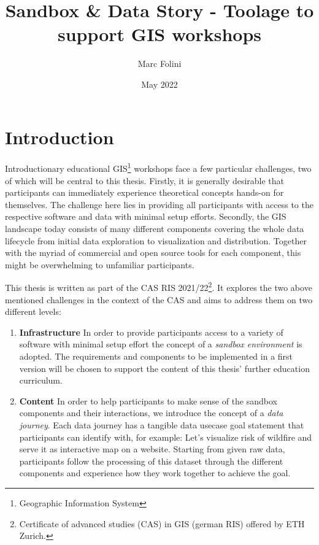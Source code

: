 \documentclass[12pt, letterpaper, twoside]{article}
\title{Sandbox \& Data Story - Toolage to support GIS workshops}
\author{Marc Folini}
\date{May 2022}
\begin{document}
\begin{titlepage}
  \setcounter{page}{1}
  \clearpage\maketitle
  \thispagestyle{empty}
  \vspace{2.5cm}
  \begin{abstract}
  \end{abstract}
\end{titlepage}

\newpage
\tableofcontents

\newpage
{}
\setcounter{page}{1}
\section{Introduction}
Introductionary educational GIS\footnote{Geographic Information System} workshops face a few particular challenges, two
of which will be central to this thesis. Firstly, it is generally desirable that participants can immediately experience
theoretical concepts hands-on for themselves. The challenge here lies in providing all participants with access to the
respective software and data with minimal setup efforts. Secondly, the GIS landscape today consists of many different
components covering the whole data lifecycle from initial data exploration to visualization and distribution. Together
with the myriad of commercial and open source tools for each component, this might be overwhelming to unfamiliar
participants.

This thesis is written as part of the CAS RIS 2021/22\footnote{Certificate of advanced studies (CAS) in GIS (german RIS)
offered by ETH Zurich.}. It explores the two above mentioned challenges in the context of the CAS and aims to address
them on two different levels:
\begin{enumerate}
  \item \textbf{Infrastructure} In order to provide participants access to a variety of software with minimal setup
  effort the concept of a \emph{sandbox environment} is adopted. The requirements and components to be implemented in a
  first version will be chosen to support the content of this thesis' further education curriculum.
  \item \textbf{Content} In order to help participants to make sense of the sandbox components and their interactions,
  we introduce the concept of a \emph{data journey}. Each data journey has a tangible data usecase goal statement that
  participants can identify with, for example: Let's visualize risk of wildfire and serve it as interactive map on a
  website. Starting from given raw data, participants follow the processing of this dataset through the different
  components and experience how they work together to achieve the goal.
\end{enumerate}
\end{document}
